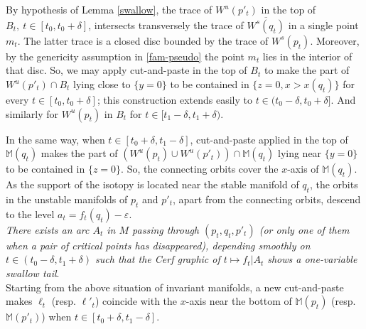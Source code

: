 \documentclass[12pt]{amsart}
\def\M{\mathbb{M}}
\def\de{\delta}
\def\ep{\varepsilon}
\def\nd{\noindent}
\begin{document}
    
    By hypothesis of Lemma \ref{swallow},   
    the trace of $W^u(p'_{t})$ in the top of $B_{t},\ t\in [t_0,t_0+\de]$,  intersects 
    transversely   the trace of  $\overline{W^s(q_{t})}$ in  a single point $m_t$. The latter
     trace is a closed disc bounded
    by the trace of $W^s(p_t)$. Moreover, by the genericity assumption in \ref{fam-pseudo}
     the point $m_t$ lies in the interior of that disc. So, we may apply 
     cut-and-paste in the top of $B_t$ to make the part of $W^u(p'_{t})\cap B_t$  
    lying close to  $\{y=0\}$ to be 
    contained in $\{z=0, x>x(q_t)\}$  %
     for every $t\in [t_0,t_0+\de]$; this construction extends easily to 
    $t\in (t_0-\de, t_0+\de]$. %
     And similarly for $W^u(p_{t})$ in $B_{t}$ for $t\in [t_1-\de,t_1+\de)$.
     
     In the same way, when $t\in [t_0+\de,t_1-\de]$, %
     cut-and-paste applied in the top of $\M(q_t)$
      makes the part of $\left(W^u(p_t)
     \cup W^u(p'_t)\right)\cap \M(q_t)$ lying near $\{y=0\}$ to be contained in $\{z=0\}$. So, the connecting 
     orbits  cover the $x$-axis of $\M(q_t)$. %
      As the support of the isotopy 
     is located near the stable manifold of $q_t$, the orbits in the unstable manifolds of $p_t$
     and $p'_t$, apart from the connecting orbits, descend to the level $a_t=f_t(q_t)-\ep$. \\
    

    
    \nd {\sc Claim 1.} {\it There exists an arc $A_t$  in $M$ 
    passing through $(p_t,q_t,p'_t)$ (or only one of them when a pair  of critical points has disappeared), 
    depending smoothly on 
    $t\in (t_0-\de,t_1+\de)$ such that
    the Cerf graphic of 
    $t\mapsto f_t\vert  A_t$ shows a one-variable swallow tail}.\\%
    
    \nd {\sc Proof.}     Starting from the above situation of invariant manifolds, a new  cut-and-paste
     makes $\ell_t$ (resp. $\ell'_t$) %
     coincide with the $x$-axis near the bottom of $\M(p_t)$ (resp. $\M(p'_t)$)
    when $t\in [t_0+\de, t_1-\de]$. %
    
\end{document}

